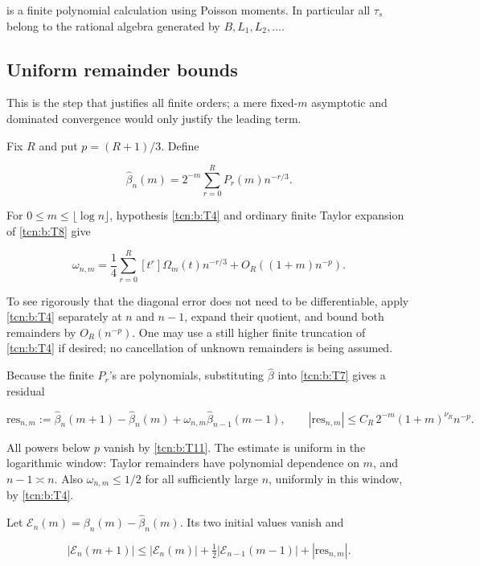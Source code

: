 \documentclass[11pt,letterpaper]{article}
\theoremstyle{remark}
\begin{document}
is a finite polynomial calculation using Poisson moments. In particular
all \(\tau_s\) belong to the rational algebra generated by
\(B,L_1,L_2,\ldots\).

\subsection{Uniform remainder bounds}\label{tcn:b:uniform-remainder-bounds}

This is the step that justifies all finite orders; a mere fixed-\(m\)
asymptotic and dominated convergence would only justify the leading
term.

Fix \(R\) and put \(p=(R+1)/3\). Define

\[
 \widehat\beta_n(m)=2^{-m}\sum_{r=0}^RP_r(m)n^{-r/3}.
\]

For \(0\le m\le\lfloor\log n\rfloor\), hypothesis \eqref{tcn:b:T4} and ordinary
finite Taylor expansion of \eqref{tcn:b:T8} give

\[
 \omega_{n,m}=\frac14\sum_{r=0}^R[t^r]\Omega_m(t)n^{-r/3}
            +O_R((1+m)n^{-p}).                               \tag{T13}\label{tcn:b:T13}
\]

To see rigorously that the diagonal error does not need to be
differentiable, apply \eqref{tcn:b:T4} separately at \(n\) and \(n-1\), expand their
quotient, and bound both remainders by \(O_R(n^{-p})\). One may use a
still higher finite truncation of \eqref{tcn:b:T4} if desired; no cancellation of
unknown remainders is being assumed.

Because the finite \(P_r\)'s are polynomials, substituting
\(\widehat\beta\) into \eqref{tcn:b:T7} gives a residual

\[
 \mathrm{res}_{n,m}:=\widehat\beta_n(m+1)-\widehat\beta_n(m)
                   +\omega_{n,m}\widehat\beta_{n-1}(m-1),\qquad
 |\mathrm{res}_{n,m}|\le C_R\,2^{-m}(1+m)^{\nu_R}n^{-p}.              \tag{T14}\label{tcn:b:T14}
\]

All powers below \(p\) vanish by \eqref{tcn:b:T11}. The estimate is uniform in the
logarithmic window: Taylor remainders have polynomial dependence on
\(m\), and \(n-1\asymp n\). Also \(\omega_{n,m}\le1/2\) for all sufficiently
large \(n\), uniformly in this window, by \eqref{tcn:b:T4}.

Let \(\mathcal E_n(m)=\beta_n(m)-\widehat\beta_n(m)\). Its two initial values vanish and

\[
 |\mathcal E_n(m+1)|\le |\mathcal E_n(m)|+\tfrac12|\mathcal E_{n-1}(m-1)|+|\mathrm{res}_{n,m}|.
                                                               \tag{T15}\label{tcn:b:T15}
\]
\end{document}
